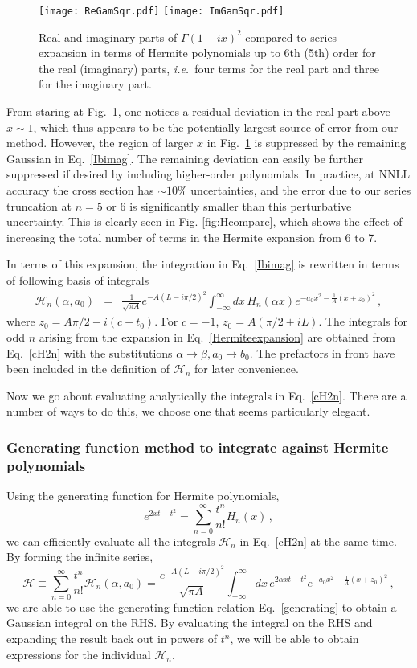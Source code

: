 \documentclass[a4,letterpaper,11pt]{article}
\newcommand{\be}{\begin{equation}}
\newcommand{\ee}{\end{equation}}
\newcommand{\bea}{\begin{eqnarray}}
\newcommand{\eea}{\end{eqnarray}}
\newcommand{\ie}{\emph{i.e.}~}
\newcommand{\cH}{\mathcal{H}}
\newcommand{\eq}[1]{Eq.~\eqref{#1}}
\newcommand{\fig}[1]{Fig.~\ref{fig:#1}}
\begin{document}
\begin{figure}
\centerline{
\texttt{[image: ReGamSqr.pdf]}
\hskip 0.2cm
\texttt{[image: ImGamSqr.pdf]}
}
\vskip-0.2cm
\caption[1]{Real and imaginary parts of $\Gamma(1-ix)^2$ compared to series expansion in terms of Hermite polynomials up to 6th (5th) order for the real (imaginary) parts, \ie four terms for the real part and three for the imaginary part.}
\label{fig:Gamma2} 
\end{figure}

From staring at \fig{Gamma2}, one notices a residual deviation in the real part above $x\sim 1$, which thus appears to be the potentially largest source of error from our method. However, the region of larger $x$ in \fig{Gamma2} is suppressed by the remaining Gaussian in \eq{Ibimag}. The remaining deviation can easily be further suppressed if desired by including higher-order polynomials.
In practice, at NNLL accuracy the cross section has $\sim 10$\% uncertainties, and the error due to our series truncation at $n=5$ or $6$ is significantly smaller than this perturbative uncertainty. This is clearly seen in Fig. \ref{fig:Hcompare}, which shows the effect of increasing the total number of terms in the Hermite expansion from 6 to 7.


In terms of this expansion, the integration in \eq{Ibimag} is rewritten in terms of following basis of integrals
\bea \label{cH2n}
\cH_{n}(\alpha,a_0) &=&  \frac{1}{\sqrt{\pi A}} e^{-A(L-i\pi/2)^2}\int_{-\infty}^\infty dx\, H_{n}(\alpha x) e^{-a_0 x^2-\frac{1}{A}( x + z_0)^2}\,,
\eea
where $z_0 = A\pi/2 - i(c-t_0)$. For $c=-1$, $z_0 = A(\pi/2 + iL)$. The integrals for odd $n$ arising from the expansion in \eq{Hermiteexpansion} are obtained from \eq{cH2n} with the substitutions $\alpha\to \beta,a_0\to b_0$. The prefactors in front have been included in the definition of $\cH_n$ for later convenience.

Now we go about evaluating analytically the integrals in \eq{cH2n}. There are a number of ways to do this, we choose one that seems particularly elegant.


\subsubsection{Generating function method to integrate against Hermite polynomials}

Using the generating function for Hermite polynomials,
\be
\label{generating}
e^{2xt -t^2} = \sum_{n=0}^\infty \frac{t^n}{n!} H_n(x)\,,
\ee
we can efficiently evaluate all the integrals $\cH_{n}$ in \eq{cH2n} at the same time. 
By forming the infinite series,
\be
\label{Hnseries}
\cH \equiv \sum_{n=0}^\infty \frac{t^n}{n!} \cH_n(\alpha,a_0) = \frac{e^{-A(L-i\pi/2)^2}}{\sqrt{\pi A}}  \int_{-\infty}^\infty dx\,e^{2\alpha xt - t^2} e^{-a_0 x^2 - \frac{1}{A}( x+ z_0)^2}\,,
\ee
we are able to use the generating function relation \eq{generating} to obtain a Gaussian integral on the RHS. By evaluating the integral on the RHS and expanding the result back out in powers of $t^n$, we will be able to obtain expressions for the individual $\cH_n$.
\end{document}
